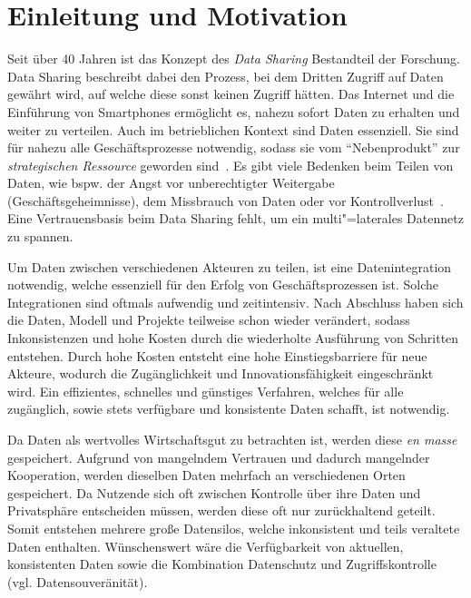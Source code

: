 
\section{Einleitung und Motivation}

Seit über 40 Jahren ist das Konzept des \emph{Data Sharing} Bestandteil der Forschung.
Data Sharing beschreibt dabei den Prozess, bei dem Dritten Zugriff auf Daten gewährt wird, auf welche diese sonst keinen Zugriff hätten.
Das Internet und die Einführung von Smartphones ermöglicht es, nahezu sofort Daten zu erhalten und weiter zu verteilen.
Auch im betrieblichen Kontext sind Daten essenziell.
Sie sind für nahezu alle Geschäftsprozesse notwendig, sodass sie vom \enquote{Nebenprodukt} zur \emph{strategischen Ressource} geworden sind~\cite{mollerIndustrialDataEcosystems2024}.
Es gibt viele Bedenken beim Teilen von Daten, wie bspw. der Angst vor unberechtigter Weitergabe (Geschäftsgeheimnisse), dem Missbrauch von Daten oder vor Kontrollverlust~\cite{mollerIndustrialDataEcosystems2024}.
Eine Vertrauensbasis beim Data Sharing fehlt, um ein multi"=laterales Datennetz zu spannen.

Um Daten zwischen verschiedenen Akteuren zu teilen, ist eine Datenintegration notwendig, welche essenziell für den Erfolg von Geschäftsprozessen ist.
Solche Integrationen sind oftmals aufwendig und zeitintensiv.
Nach Abschluss haben sich die Daten, Modell und Projekte teilweise schon wieder verändert, sodass Inkonsistenzen und hohe Kosten durch die wiederholte Ausführung von Schritten entstehen.
Durch hohe Kosten entsteht eine hohe Einstiegsbarriere für neue Akteure, wodurch die Zugänglichkeit und Innovationsfähigkeit eingeschränkt wird.
Ein effizientes, schnelles und günstiges Verfahren, welches für alle zugänglich, sowie stets verfügbare und konsistente Daten schafft, ist notwendig.

Da Daten als wertvolles Wirtschaftsgut zu betrachten ist, werden diese \emph{en masse} gespeichert.
Aufgrund von mangelndem Vertrauen und dadurch mangelnder Kooperation, werden dieselben Daten mehrfach an verschiedenen Orten gespeichert.
Da Nutzende sich oft zwischen Kontrolle über ihre Daten und Privatsphäre entscheiden müssen, werden diese oft nur zurückhaltend geteilt.
Somit entstehen mehrere große Datensilos, welche inkonsistent und teils veraltete Daten enthalten.
Wünschenswert wäre die Verfügbarkeit von aktuellen, konsistenten Daten sowie die Kombination Datenschutz und Zugriffskontrolle (vgl. Datensouveränität).

